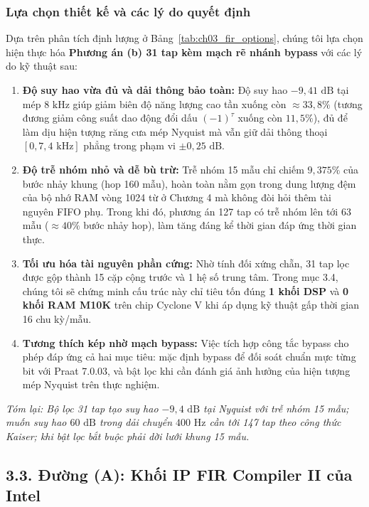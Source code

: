 \subsubsection*{Lựa chọn thiết kế và các lý do quyết định}
Dựa trên phân tích định lượng ở Bảng~\ref{tab:ch03_fir_options}, chúng tôi lựa chọn hiện thực hóa \textbf{Phương án (b) 31 tap kèm mạch rẽ nhánh bypass} với các lý do kỹ thuật sau:
\begin{enumerate}[leftmargin=1.5em, itemsep=3pt]
    \item \textbf{Độ suy hao vừa đủ và dải thông bảo toàn:} Độ suy hao $-9{,}41\text{ dB}$ tại mép $8\text{ kHz}$ giúp giảm biên độ năng lượng cao tần xuống còn $\approx 33{,}8\%$ (tương đương giảm công suất dao động đổi dấu $(-1)^\tau$ xuống còn $11{,}5\%$), đủ để làm dịu hiện tượng răng cưa mép Nyquist mà vẫn giữ dải thông thoại $[0, 7{,}4\text{ kHz}]$ phẳng trong phạm vi $\pm 0{,}25\text{ dB}$.
    \item \textbf{Độ trễ nhóm nhỏ và dễ bù trừ:} Trễ nhóm 15 mẫu chỉ chiếm $9{,}375\%$ của bước nhảy khung (hop 160 mẫu), hoàn toàn nằm gọn trong dung lượng đệm của bộ nhớ RAM vòng 1024 từ ở Chương 4 mà không đòi hỏi thêm tài nguyên FIFO phụ. Trong khi đó, phương án 127 tap có trễ nhóm lên tới 63 mẫu ($\approx 40\%$ bước nhảy hop), làm tăng đáng kể thời gian đáp ứng thời gian thực.
    \item \textbf{Tối ưu hóa tài nguyên phần cứng:} Nhờ tính đối xứng chẵn, 31 tap lọc được gộp thành 15 cặp cộng trước và 1 hệ số trung tâm. Trong mục 3.4, chúng tôi sẽ chứng minh cấu trúc này chỉ tiêu tốn đúng \textbf{1 khối DSP} và \textbf{0 khối RAM M10K} trên chip Cyclone V khi áp dụng kỹ thuật gấp thời gian 16 chu kỳ/mẫu.
    \item \textbf{Tương thích kép nhờ mạch bypass:} Việc tích hợp công tắc bypass cho phép đáp ứng cả hai mục tiêu: mặc định bypass để đối soát chuẩn mực từng bit với Praat 7.0.03, và bật lọc khi cần đánh giá ảnh hưởng của hiện tượng mép Nyquist trên thực nghiệm.
\end{enumerate}

\textit{Tóm lại: Bộ lọc 31 tap tạo suy hao $-9{,}4\text{ dB}$ tại Nyquist với trễ nhóm 15 mẫu; muốn suy hao $60\text{ dB}$ trong dải chuyển $400\text{ Hz}$ cần tới 147 tap theo công thức Kaiser; khi bật lọc bắt buộc phải dời lưới khung 15 mẫu.}

\subsection*{3.3. Đường (A): Khối IP FIR Compiler II của Intel}

